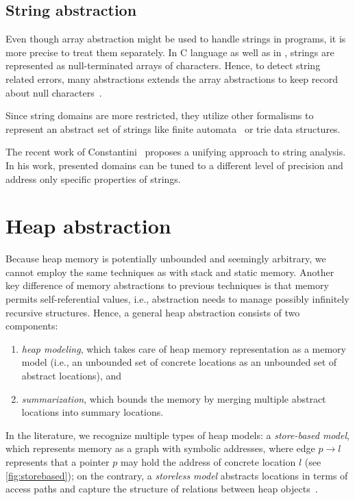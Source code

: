 \subsection{String abstraction}

Even though array abstraction might be used to handle strings in programs, it
is more precise to treat them separately. In C language as well as in \llvm,
strings are represented as null-terminated arrays of characters. Hence, to
detect string related errors, many abstractions extends the array abstractions
to keep record about null characters~\cite{Olliaro2018}.

Since string domains are more restricted, they utilize other formalisms to
represent an abstract set of strings like finite
automata~\cite{Christensen2003} or trie data structures.

The recent work of Constantini~\cite{Costantini2011, Costantini2015} proposes a
unifying approach to string analysis.  In his work, presented domains can be
tuned to a different level of precision and address only specific properties of
strings.


\section{Heap abstraction}

Because heap memory is potentially unbounded and seemingly arbitrary, we cannot
employ the same techniques as with stack and static memory. Another key
difference of memory abstractions to previous techniques is that memory permits
self-referential values, i.e., abstraction needs to manage possibly infinitely
recursive structures. Hence, a general heap abstraction consists of two
components:

\begin{enumerate}
    \item \emph{heap modeling}, which takes care of heap memory representation
        as a memory model (i.e., an unbounded set of concrete locations as an
        unbounded set of abstract locations), and
    \item \emph{summarization}, which bounds the memory by merging multiple
        abstract locations into summary locations.
\end{enumerate}

\noindent
In the literature, we recognize multiple types of heap models: a \emph{store-based
model}, which represents memory as a graph with symbolic addresses, where edge
$p \rightarrow l$ represents that a pointer $p$ may hold the address of
concrete location $l$ (see \autoref{fig:storebased}); on the contrary, a
\emph{storeless model} abstracts locations in terms of access paths and capture
the structure of relations between heap objects~\cite{Kanvar2016}.

